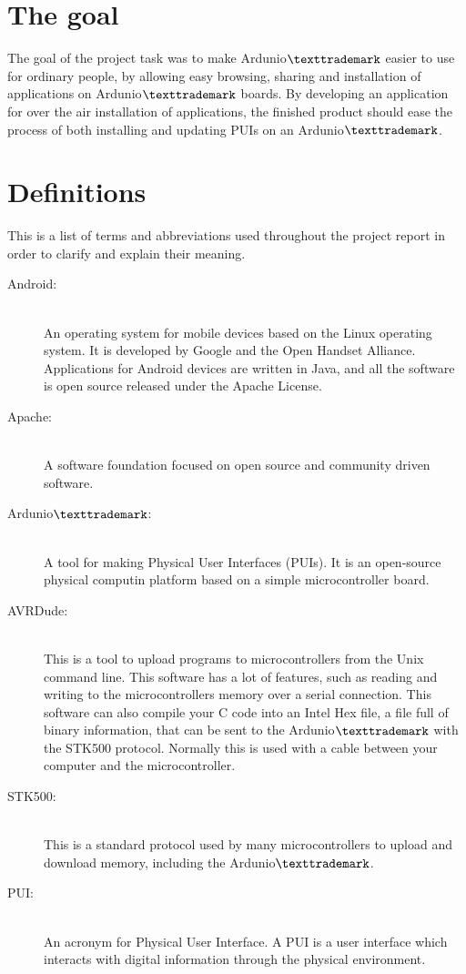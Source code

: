 \section{The goal}
The goal of the project task was to make Ardunio$\texttrademark$ easier to use for ordinary people, by allowing easy browsing, sharing and installation of applications on Ardunio$\texttrademark$ boards. By developing an application for over the air installation of applications, the finished product should ease the process of both installing and updating PUIs on an Ardunio$\texttrademark$.


\section{Definitions}
This is a list of terms and abbreviations used throughout the project report in order to clarify and explain their meaning.

\begin{description}

\item[Android:]\hfill \\
An operating system for mobile devices based on the Linux operating system. It is developed by Google and the Open Handset Alliance. Applications for Android devices are written in Java, and all the software is open source released under the Apache License.

\item[Apache:] \hfill \\
A software foundation focused on open source and community driven software.

\item[Ardunio$\texttrademark$:]\hfill \\
A tool for making Physical User Interfaces (PUIs). It is an open-source physical computin platform based on a simple microcontroller board.

\item[AVRDude:]\hfill \\
This is a tool to upload programs to microcontrollers from the Unix command line. This software has a lot of features, such as reading and writing to the microcontrollers memory over a serial connection. This software can also compile your C code into an Intel Hex file, a file full of binary information, that can be sent to the Ardunio$\texttrademark$ with the STK500 protocol. Normally this is used with a cable between your computer and the microcontroller.

\item[STK500:]\hfill \\
This is a standard protocol used by many microcontrollers to upload and download memory, including the Ardunio$\texttrademark$.

\item[PUI:]\hfill \\
An acronym for Physical User Interface. A PUI is a user interface which interacts with digital information through the physical environment.

\end{description}

